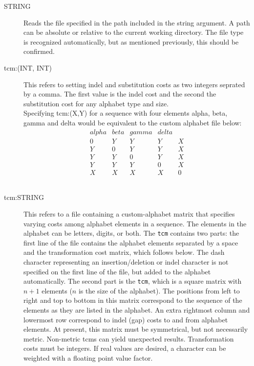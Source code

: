 \begin{description}
		\item[STRING] Reads the file specified in the path included in the string argument. A path 
		can be absolute or relative to the current working directory. The file type is recognized
		automatically, but as mentioned previously, this should be confirmed.
		
		\item [tcm:(INT, INT)] This refers to setting indel and substitution costs as two integers
		seprated by a comma. The first value is the indel cost and the second the substitution cost
		for any alphabet type and size.\\
		
		Specifying tcm:(X,Y) for a sequence with four elements alpha, beta, gamma and delta would be
		equivalent to the custom alphabet file below:
		\\
		\begin{equation*}
			\begin{array}{lllll}
				alpha & beta & gamma & delta &  \\
				0 &  Y &  Y &  Y &   X \\
				Y &  0 &  Y &  Y &   X \\
				Y &  Y &  0 &  Y &   X \\
				Y &  Y &  Y &  0 &   X \\
				X &  X &  X &  X &   0
			\end{array}
		\end{equation*} 
		\\
		

		\item [tcm:STRING] This refers to a file containing a custom-alphabet matrix that 
		specifies varying costs among alphabet elements in a sequence. The elements in 
		the alphabet can be letters, digits, or both.
		The \texttt{tcm} contains two parts: the first line of the file contains the alphabet elements 
		separated by a space and the transformation cost matrix, which follows below. The dash 
		character representing an insertion/deletion or indel character is not specified on the first 
		line of the file, but added to the alphabet automatically. The second part is the \texttt{tcm}, 
		which is a square matrix with $n + 1$ elements ($n$ is the size of the alphabet). 
		The positions from left to right and top to bottom in this matrix correspond to the sequence 
		of the elements as they are listed in the alphabet. An extra rightmost column and lowermost
		row correspond to indel (gap) costs to and from alphabet elements. At present, this matrix 
		must be symmetrical, but not necessarily metric. Non-metric tcms can yield unexpected 
		results. Transformation costs must be integers. If real values are desired, a character can 
		be weighted with a floating point value factor. \\
		

\end{description}

